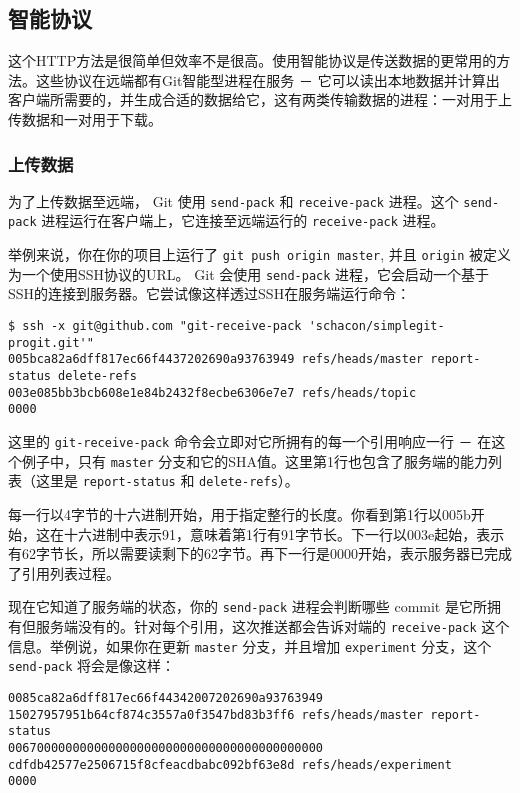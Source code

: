 \documentclass[a4paper]{book}
\begin{document}
\subsection{智能协议}

这个HTTP方法是很简单但效率不是很高。使用智能协议是传送数据的更常用的方法。这些协议在远端都有Git智能型进程在服务 － 它可以读出本地数据并计算出客户端所需要的，并生成合适的数据给它，这有两类传输数据的进程：一对用于上传数据和一对用于下载。

\subsubsection{上传数据}

为了上传数据至远端， Git 使用 \texttt{send-pack} 和 \texttt{receive-pack} 进程。这个 \texttt{send-pack} 进程运行在客户端上，它连接至远端运行的 \texttt{receive-pack} 进程。

举例来说，你在你的项目上运行了 \texttt{git push origin master}, 并且 \texttt{origin} 被定义为一个使用SSH协议的URL。 Git 会使用 \texttt{send-pack} 进程，它会启动一个基于SSH的连接到服务器。它尝试像这样透过SSH在服务端运行命令：

\begin{shaded}\begin{verbatim}
$ ssh -x git@github.com "git-receive-pack 'schacon/simplegit-progit.git'"
005bca82a6dff817ec66f4437202690a93763949 refs/heads/master report-status delete-refs
003e085bb3bcb608e1e84b2432f8ecbe6306e7e7 refs/heads/topic
0000
\end{verbatim}\end{shaded}

这里的 \texttt{git-receive-pack} 命令会立即对它所拥有的每一个引用响应一行 － 在这个例子中，只有 \texttt{master} 分支和它的SHA值。这里第1行也包含了服务端的能力列表（这里是 \texttt{report-status} 和 \texttt{delete-refs}）。

每一行以4字节的十六进制开始，用于指定整行的长度。你看到第1行以005b开始，这在十六进制中表示91，意味着第1行有91字节长。下一行以003e起始，表示有62字节长，所以需要读剩下的62字节。再下一行是0000开始，表示服务器已完成了引用列表过程。

现在它知道了服务端的状态，你的 \texttt{send-pack} 进程会判断哪些 commit 是它所拥有但服务端没有的。针对每个引用，这次推送都会告诉对端的 \texttt{receive-pack} 这个信息。举例说，如果你在更新 \texttt{master} 分支，并且增加 \texttt{experiment} 分支，这个 \texttt{send-pack} 将会是像这样：

\begin{shaded}\begin{verbatim}
0085ca82a6dff817ec66f44342007202690a93763949  15027957951b64cf874c3557a0f3547bd83b3ff6 refs/heads/master report-status
00670000000000000000000000000000000000000000 cdfdb42577e2506715f8cfeacdbabc092bf63e8d refs/heads/experiment
0000
\end{verbatim}\end{shaded}
\end{document}
